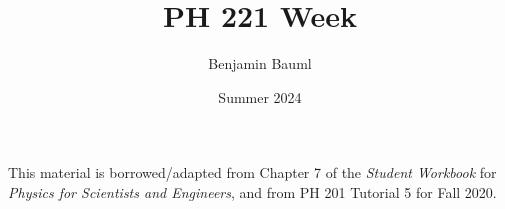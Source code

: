 \documentclass[]{article}
\title{PH 221 Week \Week}
\author{Benjamin Bauml}
\date{Summer 2024}
\newcommand{\FileDepth}{../../..}
\begin{document}
\maketitle
\begin{center}
	This material is borrowed/adapted from Chapter 7 of the \textit{Student Workbook} for \textit{Physics for Scientists and Engineers}, and from PH 201 Tutorial 5 for Fall 2020.
\end{center}



\end{document}

